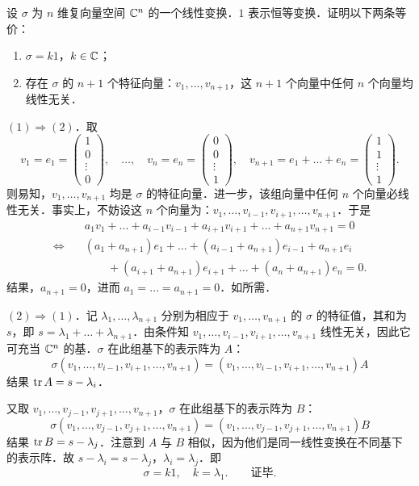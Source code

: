 设 $\sigma$ 为 $n$ 维复向量空间 $\mathbb{C}^{n}$ 的一个线性变换．$1$ 表示恒等变换．证明以下两条等价：
\begin{enumerate}[label=(\arabic*)]
  \item $\sigma=k1$，$k\in\mathbb{C}$；
  \item 存在 $\sigma$ 的 $n+1$ 个特征向量：$v_{1},\dots,v_{n+1}$，这 $n+1$ 个向量中任何 $n$ 个向量均线性无关．
\end{enumerate}
\begin{solution}
$(1)\Rightarrow(2)$．取
\[
  v_{1}=e_{1}=\begin{pmatrix}1\\0\\\vdots\\0\end{pmatrix},\quad\dots,\quad
  v_{n}=e_{n}=\begin{pmatrix}0\\0\\\vdots\\1\end{pmatrix},\quad
  v_{n+1}=e_{1}+\dots+e_{n}=\begin{pmatrix}1\\1\\\vdots\\1\end{pmatrix}.
\]
则易知，$v_{1},\dots,v_{n+1}$ 均是 $\sigma$ 的特征向量．进一步，该组向量中任何 $n$ 个向量必线性无关．事实上，不妨设这 $n$ 个向量为：$v_{1},\dots,v_{i-1},v_{i+1},\dots,v_{n+1}$．于是
\begin{align*}
  &a_{1}v_{1}+\dots+a_{i-1}v_{i-1}+a_{i+1}v_{i+1}+\dots+a_{n+1}v_{n+1}=0\\
  \Leftrightarrow\quad
  &(a_{1}+a_{n+1})e_{1}+\dots+(a_{i-1}+a_{n+1})e_{i-1}+a_{n+1}e_{i}\\
  &\qquad +(a_{i+1}+a_{n+1})e_{i+1}+\dots+(a_{n}+a_{n+1})e_{n}=0.
\end{align*}
结果，$a_{n+1}=0$，进而 $a_{1}=\dots=a_{n+1}=0$．如所需．

$(2)\Rightarrow(1)$．记 $\lambda_{1},\dots,\lambda_{n+1}$ 分别为相应于 $v_{1},\dots,v_{n+1}$ 的 $\sigma$ 的特征值，其和为 $s$，即 $s=\lambda_{1}+\dots+\lambda_{n+1}$．由条件知 $v_{1},\dots,v_{i-1},v_{i+1},\dots,v_{n+1}$ 线性无关，因此它可充当 $\mathbb{C}^{n}$ 的基．$\sigma$ 在此组基下的表示阵为 $A$：
\[
  \sigma(v_{1},\dots,v_{i-1},v_{i+1},\dots,v_{n+1})=(v_{1},\dots,v_{i-1},v_{i+1},\dots,v_{n+1})A
\]
结果 $\operatorname{tr} A=s-\lambda_{i}$．

又取 $v_{1},\dots,v_{j-1},v_{j+1},\dots,v_{n+1}$，$\sigma$ 在此组基下的表示阵为 $B$：
\[
  \sigma(v_{1},\dots,v_{j-1},v_{j+1},\dots,v_{n+1})=(v_{1},\dots,v_{j-1},v_{j+1},\dots,v_{n+1})B
\]
结果 $\operatorname{tr} B=s-\lambda_{j}$．注意到 $A$ 与 $B$ 相似，因为他们是同一线性变换在不同基下的表示阵．故 $s-\lambda_{i}=s-\lambda_{j}$，$\lambda_{i}=\lambda_{j}$．即
\[
  \sigma=k1,\quad k=\lambda_{1}.\qquad\text{证毕.}
\]
\end{solution}

